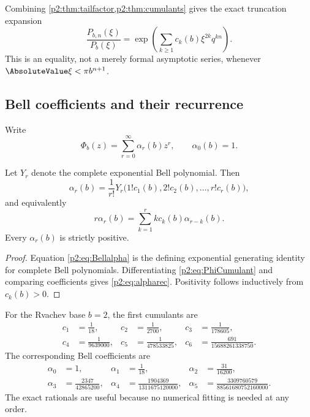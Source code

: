 \documentclass[11pt,oneside]{article}
\numberwithin{equation}{section}
\theoremstyle{definition}
\theoremstyle{remark}
\begin{document}
Combining \cref{p2:thm:tailfactor,p2:thm:cumulants} gives the exact truncation expansion
\begin{equation}
 \frac{P_{b,n}(\xi)}{P_b(\xi)}
 =\exp\!\left(\sum_{k\geq1}c_k(b)\xi^{2k}q^{kn}\right).
 \label{p2:eq:tailn}
\end{equation}
This is an equality, not a merely formal asymptotic series, whenever
\(\AbsoluteValue\xi<\pi b^{n+1}\).

\subsection{Bell coefficients and their recurrence}

Write
\begin{equation}
 \Phi_b(z)=\sum_{r=0}^{\infty}\alpha_r(b)z^r,
 \qquad \alpha_0(b)=1.
 \label{p2:eq:alphadef}
\end{equation}

\begin{proposition}
\label{p2:prop:Bell}
Let \(Y_r\) denote the complete exponential Bell polynomial. Then
\begin{equation}
 \alpha_r(b)=\frac1{r!}
 Y_r\bigl(1!c_1(b),2!c_2(b),\ldots,r!c_r(b)\bigr),
 \label{p2:eq:Bellalpha}
\end{equation}
and equivalently
\begin{equation}
 r\alpha_r(b)=\sum_{k=1}^r k c_k(b)\alpha_{r-k}(b).
 \label{p2:eq:alpharec}
\end{equation}
Every \(\alpha_r(b)\) is strictly positive.
\end{proposition}

\begin{proof}
Equation \eqref{p2:eq:Bellalpha} is the defining exponential generating identity for
complete Bell polynomials. Differentiating \eqref{p2:eq:PhiCumulant} and comparing
coefficients gives \eqref{p2:eq:alpharec}. Positivity follows inductively from
\(c_k(b)>0\).
\end{proof}

For the Rvachev base \(b=2\), the first cumulants are
\begin{align*}
 c_1&=\frac1{18},&c_2&=\frac1{2700},&c_3&=\frac1{178605},\\
 c_4&=\frac1{9639000},&c_5&=\frac1{478533825},&
 c_6&=\frac{691}{15688261338750}.
\end{align*}
The corresponding Bell coefficients are
\begin{align}
 \alpha_0&=1,&
 \alpha_1&=\frac1{18},&
 \alpha_2&=\frac{31}{16200},\\
 \alpha_3&=\frac{2347}{42865200},&
 \alpha_4&=\frac{1904369}{1311675120000},&
 \alpha_5&=\frac{3309760579}{88561680752160000}.
 \label{p2:eq:alphaB2}
\end{align}
The exact rationals are useful because no numerical fitting is needed at any
order.
\end{document}
